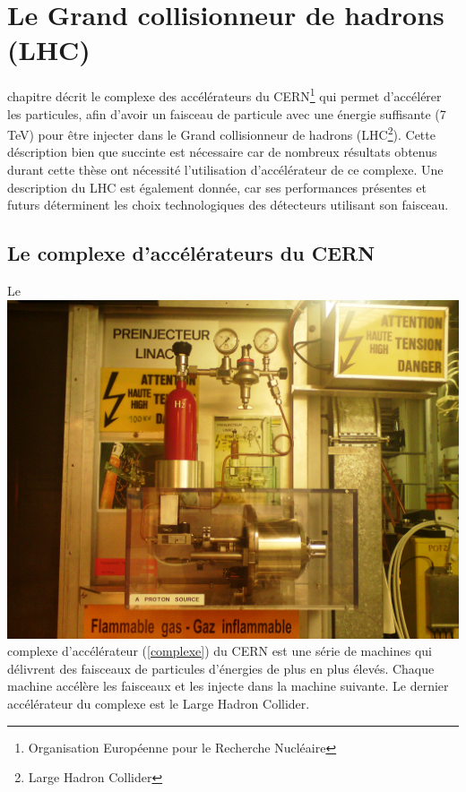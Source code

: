 \chapter{Le Grand collisionneur de hadrons (LHC)}
\renewcommand\chapterillustration{LHC/lhc}
\ThisULCornerWallPaper{1}{\chapterillustration}
\minitoc
\vspace{1cm}
 chapitre décrit le complexe des accélérateurs du CERN\footnote{Organisation Européenne pour le Recherche Nucléaire} qui permet d'accélérer les particules, afin d'avoir un faisceau de particule avec une énergie suffisante (7 TeV) pour être injecter dans le Grand collisionneur de hadrons (LHC\footnote{Large Hadron Collider}). Cette déscription bien que succinte est nécessaire car de nombreux résultats obtenus durant cette thèse ont nécessité l'utilisation d'accélérateur de ce complexe. Une description du LHC est également donnée, car ses performances présentes et futurs déterminent les choix technologiques des détecteurs utilisant son faisceau.

\section{Le complexe d'accélérateurs du CERN}
Le \marginpar
{
	\includegraphics[width=\marginparwidth]{LHC/Bouteille.jpg}
	\label{bouteille}
}	complexe d'accélérateur (\ref{complexe}) du CERN est une série de machines qui délivrent des faisceaux de particules d'énergies de plus en plus élevés. Chaque machine accélère les faisceaux et les injecte dans la machine suivante. Le dernier accélérateur du complexe est le Large Hadron Collider.

